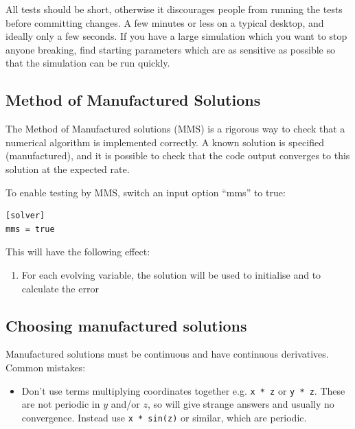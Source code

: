 \documentclass[12pt]{article}
\begin{document}
All tests should be short, otherwise it discourages people from running the
tests before committing changes. A few minutes or less on a typical desktop,
and ideally only a few seconds. If you have a large simulation which you want
to stop anyone breaking, find starting parameters which are as sensitive as
possible so that the simulation can be run quickly.



\subsection{Method of Manufactured Solutions}
%
The Method of Manufactured solutions (MMS) is a rigorous way to check that a
numerical algorithm is implemented correctly. A known solution is specified
(manufactured), and it is possible to check that the code output converges to
this solution at the expected rate.

To enable testing by MMS, switch an input option ``mms'' to true:
%
\begin{lstlisting}
[solver]
mms = true
\end{lstlisting}
%
This will have the following effect:
%
\begin{enumerate}
\item For each evolving variable, the solution will be used to initialise and
    to calculate the error
\end{enumerate}
%



\subsection{Choosing manufactured solutions}
%
Manufactured solutions must be continuous and have continuous derivatives.
Common mistakes:
%
\begin{itemize}
\item Don't use terms multiplying coordinates together e.g. \texttt{x * z} or
    \texttt{y * z}. These are not periodic in $y$ and/or $z$, so will give
    strange answers and usually no convergence. Instead use \texttt{x * sin(z)}
    or similar, which are periodic.
\end{itemize}
%
\end{document}
